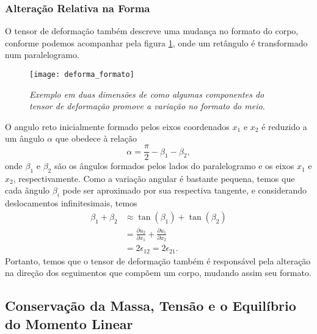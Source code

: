 \subsubsection{Altera\c{c}\~ao Relativa na Forma}

O tensor de deforma\c{c}\~ao tamb\'em descreve uma mudan\c{c}a no formato do corpo, conforme podemos acompanhar pela figura \ref{fig.deforma_formato}, onde um ret\^angulo \'e transformado num paralelogramo. 
\begin{figure}
\centering
\texttt{[image: deforma\_formato]}
\caption{\textit{Exemplo em duas dimens\~oes de como algumas componentes do tensor de deforma\c{c}\~ao promove a varia\c{c}\~ao no formato do meio.}}
\label{fig.deforma_formato}
\end{figure}
O angulo reto inicialmente formado pelos eixos coordenados $x_1$ e $x_2$ \'e reduzido a um \^angulo $\alpha$ que obedece \`a rela\c{c}\~ao
\begin{equation*}
\alpha=\frac{\pi}{2}-\beta_1-\beta_2,
\end{equation*}
onde $\beta_1$ e $\beta_2$ s\~ao os \^angulos formados pelos lados do paralelogramo e os eixos $x_1$ e $x_2$, respectivamente. Como a varia\c{c}\~ao angular \'e bastante pequena, temos que cada \^angulo $\beta_i$ pode ser aproximado por sua respectiva tangente, e considerando deslocamentos infinitesimais, temos
\begin{align*}
\beta_1+\beta_2&\approx\tan(\beta_1)+\tan(\beta_2)\\
&=\frac{\partial u_2}{\partial x_1}+\frac{\partial u_1}{\partial x_2}\\
&=2\epsilon_{12}=2\epsilon_{21}.
\end{align*}
Portanto, temos que o tensor de deforma\c{c}\~ao tamb\'em \'e respons\'avel pela altera\c{c}\~ao na dire\c{c}\~ao dos seguimentos que comp\~oem um corpo, mudando assim seu formato.


\subsection{Conserva\c{c}\~ao da Massa, Tens\~ao e o Equil\'ibrio do Momento Linear}\label{sec.massa_tensao_momen_lin}

